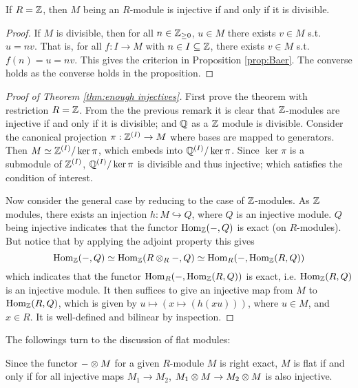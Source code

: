\begin{corollary}
    If $R = \mathbb{Z}$, then $M$ being an $R$-module is injective if and only if it is divisible.
\end{corollary}

\begin{proof}
    If $M$ is divisible, then for all $n\in \mathbb{Z}_{\geq 0}$, $u\in M$ there exists $v \in M$ s.t. $u = nv$. That is, for all $f: I \to M$ with $n \in I \subseteq \mathbb{Z}$, there exists $v \in M$ s.t. $f(n) = u = nv$. This gives the criterion in Proposition \ref{prop:Baer}. The converse holds as the converse holds in the proposition.
\end{proof}

\begin{proof}[Proof of Theorem \ref{thm:enough injectives}]
    First prove the theorem with restriction $R = \mathbb{Z}$. From the the previous remark it is clear that $\mathbb{Z}$-modules are injective if and only if it is divisible; and $\mathbb{Q}$ as a $\mathbb{Z}$ module is divisible. Consider the canonical projection $\pi: \mathbb{Z}^{(I)} \to M$ where bases are mapped to generators. Then $M \simeq \mathbb{Z}^{(I)}/\ker \pi$, which embeds into $\mathbb{Q}^{(I)}/\ker \pi$. Since $\ker\pi$ is a submodule of $\mathbb{Z}^{(I)}$, $\mathbb{Q}^{(I)}/\ker \pi$ is divisible and thus injective; which satisfies the condition of interest.

    Now consider the general case by reducing to the case of $\mathbb{Z}$-modules. As $\mathbb{Z}$ modules, there exists an injection $h: M \hookrightarrow Q$, where $Q$ is an injective module. $Q$ being injective indicates that the functor $\mathrm{Hom}_{\mathbb{Z}}(-, Q)$ is exact (on $R$-modules). But notice that by applying the adjoint property this gives
    \[
        \mathrm{Hom}_{\mathbb{Z}}(-, Q) \simeq \mathrm{Hom}_{\mathbb{Z}}(R \otimes_R -, Q) \simeq \mathrm{Hom}_{R}(-, \mathrm{Hom}_{\mathbb{Z}}(R, Q))
    \] 
    which indicates that the functor $\mathrm{Hom}_{R}(-, \mathrm{Hom}_{\mathbb{Z}}(R, Q))$ is exact, i.e. $\mathrm{Hom}_{\mathbb{Z}}(R, Q)$ is an injective module. It then suffices to give an injective map from $M$ to $\mathrm{Hom}_{\mathbb{Z}}(R, Q)$, which is given by $u \mapsto (x \mapsto (h(xu)))$, where $u \in M$, and $x \in R$. It is well-defined and bilinear by inspection.
\end{proof}

The followings turn to the discussion of flat modules:

\begin{remark}
    Since the functor $- \otimes M$ for a given $R$-module $M$ is right exact, $M$ is flat if and only if for all injective maps $M_1 \to M_2$, $M_1 \otimes M \to M_2 \otimes M$ is also injective. 
\end{remark}


